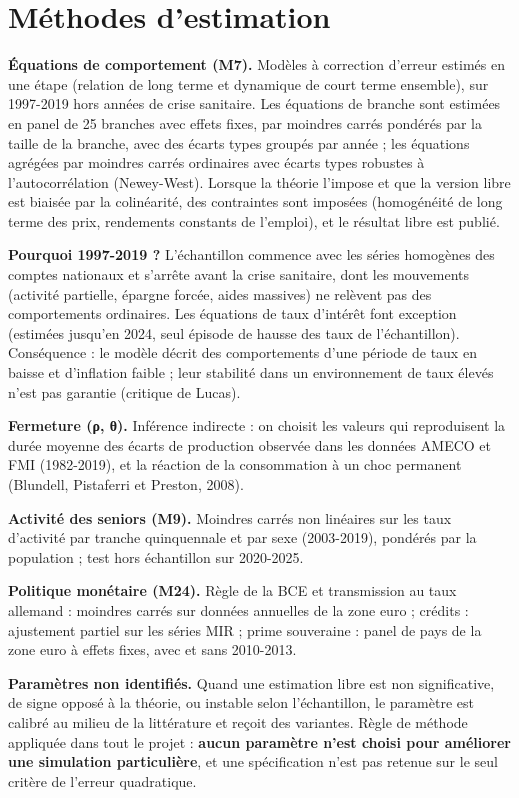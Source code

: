 \documentclass[
  11pt,
  11pt,
  a4paper,
  openany]{book}
\begin{document}
\hypertarget{sec:methodes}{%
\section{Méthodes d'estimation}\label{sec:methodes}}

\textbf{Équations de comportement (M7).} Modèles à correction d'erreur
estimés en une étape (relation de long terme et dynamique de court terme
ensemble), sur 1997-2019 hors années de crise sanitaire. Les équations
de branche sont estimées en panel de 25 branches avec effets fixes, par
moindres carrés pondérés par la taille de la branche, avec des écarts
types groupés par année ; les équations agrégées par moindres carrés
ordinaires avec écarts types robustes à l'autocorrélation (Newey-West).
Lorsque la théorie l'impose et que la version libre est biaisée par la
colinéarité, des contraintes sont imposées (homogénéité de long terme
des prix, rendements constants de l'emploi), et le résultat libre est
publié.

\textbf{Pourquoi 1997-2019 ?} L'échantillon commence avec les séries
homogènes des comptes nationaux et s'arrête avant la crise sanitaire,
dont les mouvements (activité partielle, épargne forcée, aides massives)
ne relèvent pas des comportements ordinaires. Les équations de taux
d'intérêt font exception (estimées jusqu'en 2024, seul épisode de hausse
des taux de l'échantillon). Conséquence : le modèle décrit des
comportements d'une période de taux en baisse et d'inflation faible ;
leur stabilité dans un environnement de taux élevés n'est pas garantie
(critique de Lucas).

\textbf{Fermeture (ρ, θ).} Inférence indirecte : on choisit les valeurs
qui reproduisent la durée moyenne des écarts de production observée dans
les données AMECO et FMI (1982-2019), et la réaction de la consommation
à un choc permanent (Blundell, Pistaferri et Preston, 2008).

\textbf{Activité des seniors (M9).} Moindres carrés non linéaires sur
les taux d'activité par tranche quinquennale et par sexe (2003-2019),
pondérés par la population ; test hors échantillon sur 2020-2025.

\textbf{Politique monétaire (M24).} Règle de la BCE et transmission au
taux allemand : moindres carrés sur données annuelles de la zone euro ;
crédits : ajustement partiel sur les séries MIR ; prime souveraine :
panel de pays de la zone euro à effets fixes, avec et sans 2010-2013.

\textbf{Paramètres non identifiés.} Quand une estimation libre est non
significative, de signe opposé à la théorie, ou instable selon
l'échantillon, le paramètre est calibré au milieu de la littérature et
reçoit des variantes. Règle de méthode appliquée dans tout le projet :
\textbf{aucun paramètre n'est choisi pour améliorer une simulation
particulière}, et une spécification n'est pas retenue sur le seul
critère de l'erreur quadratique.
\end{document}
